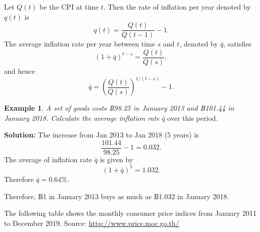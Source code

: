 \documentclass[
]{book}
\theoremstyle{definition}
\theoremstyle{definition}
\newtheorem{example}{Example}[chapter]
\theoremstyle{definition}
\theoremstyle{definition}
\theoremstyle{remark}
\begin{document}
Let \(Q(t)\) be the CPI at time \(t\). Then the rate of inflation per year
denoted by \(q(t)\) is \[q(t) = \frac{Q(t)}{Q(t-1)} - 1.\] The average
inflation rate per year between time \(s\) and \(t\), denoted by \(\bar{q}\),
satisfies \[(1 + \bar{q})^{t-s} = \frac{Q(t)}{Q(s)},\] and hence
\[\bar{q} = \left( \frac{Q(t)}{Q(s)}  \right)^{1/(t-s)} - 1.\]

\begin{example}
\emph{A set of goods costs ฿98.25 in January 2013 and ฿101.44 in January
2018. Calculate the average inflation rate} \(\bar{q}\) over this period.
\end{example}

\textbf{Solution:} The increase from Jan 2013 to Jan 2018 (5 years) is
\[\frac{101.44}{98.25}  - 1 =   0.032.\] The average of inflation rate
\(\bar{q}\) is given by \[(1  + \bar{q})^5 = 1.032.\] Therefore
\(\bar{q} = 0.64\%\).

Therefore, ฿1 in January 2013 buys as much as ฿1.032 in January 2018.

The following table shows the monthly consumer price indices from
January 2011 to December 2019. Source: \url{http://www.price.moc.go.th/}
\end{document}
